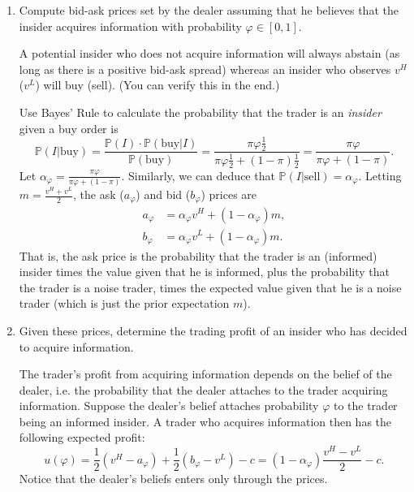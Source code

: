 \documentclass[11pt
, answers
]{exam}
\begin{document}
\begin{enumerate} [label=(\alph*). ]

\item Compute bid-ask prices set by the dealer assuming that he believes that the insider acquires information with probability $\varphi \in [0,1]$.

\begin{solution}
A potential insider who does not acquire information will always abstain (as long as there is a positive bid-ask spread) whereas an insider who observes $v^H$ ($v^L$) will buy (sell). (You can verify this in the end.)

Use Bayes' Rule to calculate the probability that the trader is an \textit{insider} given a buy order is
\[
\mathbb{P}(I|\text{buy}) = \frac{\mathbb{P}(I) \cdot \mathbb{P}(\text{buy}|I)}{\mathbb{P}(\text{buy})} =\frac{\pi \varphi \frac{1}{2}}{\pi \varphi \frac{1}{2} + (1-\pi)\frac{1}{2}} = \frac{\pi \varphi }{\pi \varphi  + (1-\pi)}.
\]
Let $\alpha_\varphi = \frac{\pi \varphi }{\pi \varphi  + (1-\pi)}$. Similarly, we can deduce that $\mathbb{P}(I|\text{sell})=\alpha_\varphi$. Letting $m=\frac{v^H+v^L}{2}$, the ask ($a_\varphi$) and bid ($b_\varphi$) prices are
\begin{align*}
a_\varphi & = \alpha_\varphi v^H+(1-\alpha_\varphi) m, \\
b_\varphi & = \alpha_\varphi v^L+(1-\alpha_\varphi) m.
\end{align*}
That is, the ask price is the probability that the trader is an (informed) insider times the value given that he is informed, plus the probability that the trader is a noise trader, times the expected value  given that he is a noise trader (which is just the prior expectation $m$).
\end{solution}

\item Given these prices, determine the trading profit of an insider who has decided to acquire information.

\begin{solution}
The trader's profit from acquiring information depends on the belief of the dealer, i.e. the probability that the dealer attaches to the trader acquiring information. Suppose the dealer's belief attaches probability $\varphi$ to the trader being an informed insider. A trader who acquires information then has the following expected profit:
\[
u(\varphi) = \frac{1}{2}(v^H - a_\varphi) + \frac{1}{2}(b_\varphi - v^L) - c = (1-\alpha_\varphi) \frac{v^H-v^L}{2}-c.
\]
Notice that the dealer's beliefs enters only through the prices.
\end{solution}


\end{enumerate}
\end{document}
